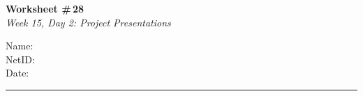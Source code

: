 \documentclass[11pt]{article}
\begin{document}
\noindent
\begin{minipage}[t]{0.55\textwidth}
  \vspace{0pt}
  {\LARGE \textbf{Worksheet \#\,28}} \\[0.3em]
  {\large \textit{Week 15, Day 2: Project Presentations}}
\end{minipage}
\hfill
\begin{minipage}[t]{0.40\textwidth}
  \vspace{0pt}
  \begin{mdframed}[linecolor=black, linewidth=1pt, innertopmargin=10pt, innerbottommargin=10pt]
    \small
    \vspace{0.4cm}
    Name: \underline{\hspace{4.5cm}} \\[1em]
    NetID: \underline{\hspace{4.3cm}} \\[1em]
    Date: \underline{\hspace{4.4cm}} \\
  \end{mdframed}
\end{minipage}

\vspace{1em}
\noindent\rule{\linewidth}{1pt}
\vspace{0.2em}
\end{document}
